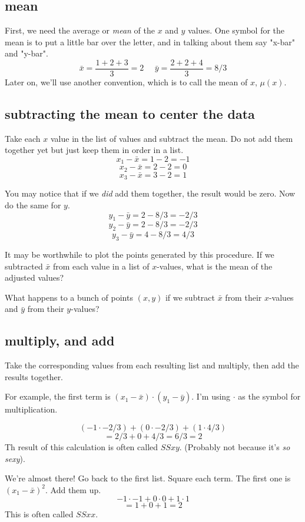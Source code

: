 \documentclass[11pt, oneside]{article}
\begin{document}
\subsection*{mean}
First, we need the average or \emph{mean} of the $x$ and $y$ values.  One symbol for the mean is to put a little bar over the letter, and in talking about them say "x-bar" and "y-bar".
\[ \bar{x} = \frac{1 + 2 + 3}{3} = 2 \ \ \ \ \ \ \bar{y} = \frac{2 + 2 + 4}{3} = 8/3 \]
Later on, we'll use another convention, which is to call the mean of $x$, $\mu(x)$.

\subsection*{subtracting the mean to center the data}
Take each $x$ value in the list of values and subtract the mean.  Do not add them together yet but just keep them in order in a list.
\[ x_1 - \bar{x} = 1 - 2 = - 1 \]
\[ x_2 - \bar{x} = 2 - 2 = 0 \]
\[ x_3 - \bar{x} = 3 - 2 = 1 \]

You may notice that if we \emph{did} add them together, the result would be zero.  Now do the same for $y$.
\[ y_1 - \bar{y} = 2 - 8/3 = - 2/3 \]
\[ y_2 - \bar{y} = 2 - 8/3 = - 2/3 \]
\[ y_3 - \bar{y} = 4 - 8/3 = 4/3 \]

It may be worthwhile to plot the points generated by this procedure.  If we subtracted $\bar{x}$ from each value in a list of $x$-values, what is the mean of the adjusted values?

What happens to a bunch of points $(x,y)$ if we subtract $\bar{x}$ from their $x$-values and $\bar{y}$ from their $y$-values?

\subsection*{multiply, and add}
Take the corresponding values from each resulting list and multiply, then add the results together.

For example, the first term is $(x_1 - \bar{x}) \cdot (y_1 - \bar{y})$.  I'm using $\cdot$ as the symbol for multiplication.

\[ (-1 \cdot -2/3) + (0 \cdot -2/3) + (1 \cdot 4/3) \]
\[ = 2/3 + 0 + 4/3 = 6/3 = 2 \]
Th result of this calculation  is often called $SSxy$.  (Probably not because it's \emph{so sexy}).  

We're almost there!  Go back to the first list.  Square each term.  The first one is $(x_1 - \bar{x})^2$.  Add them up.
\[ -1 \cdot -1 + 0 \cdot 0 + 1 \cdot 1 \]
\[ = 1 + 0 + 1 = 2 \]
This is often called $SSxx$.
\end{document}
